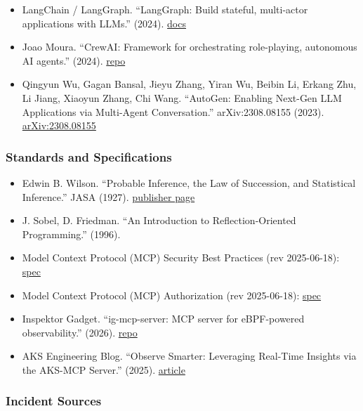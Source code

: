 \documentclass[
]{article}
\providecommand{\tightlist}{%
  \setlength{\itemsep}{0pt}\setlength{\parskip}{0pt}}
\begin{document}
\begin{itemize}
\tightlist
\item
  LangChain / LangGraph. ``LangGraph: Build stateful, multi-actor
  applications with LLMs.'' (2024).
  \href{https://langchain-ai.github.io/langgraph/}{docs}
\item
  Joao Moura. ``CrewAI: Framework for orchestrating role-playing,
  autonomous AI agents.'' (2024).
  \href{https://github.com/crewAIInc/crewAI}{repo}
\item
  Qingyun Wu, Gagan Bansal, Jieyu Zhang, Yiran Wu, Beibin Li, Erkang
  Zhu, Li Jiang, Xiaoyun Zhang, Chi Wang. ``AutoGen: Enabling Next-Gen
  LLM Applications via Multi-Agent Conversation.'' arXiv:2308.08155
  (2023). \href{https://arxiv.org/abs/2308.08155}{arXiv:2308.08155}
\end{itemize}

\subsubsection{Standards and
Specifications}\label{standards-and-specifications}

\begin{itemize}
\tightlist
\item
  Edwin B. Wilson. ``Probable Inference, the Law of Succession, and
  Statistical Inference.'' JASA (1927).
  \href{https://www.tandfonline.com/doi/abs/10.1080/01621459.1927.10502953}{publisher
  page}
\item
  J. Sobel, D. Friedman. ``An Introduction to Reflection-Oriented
  Programming.'' (1996).
\item
  Model Context Protocol (MCP) Security Best Practices (rev 2025-06-18):
  \href{https://modelcontextprotocol.io/specification/2025-06-18/basic/security_best_practices}{spec}
\item
  Model Context Protocol (MCP) Authorization (rev 2025-06-18):
  \href{https://modelcontextprotocol.io/specification/2025-06-18/basic/authorization}{spec}
\item
  Inspektor Gadget. ``ig-mcp-server: MCP server for eBPF-powered
  observability.'' (2026).
  \href{https://github.com/inspektor-gadget/ig-mcp-server}{repo}
\item
  AKS Engineering Blog. ``Observe Smarter: Leveraging Real-Time Insights
  via the AKS-MCP Server.'' (2025).
  \href{https://blog.aks.azure.com/2025/08/20/real-time-observability-in-aks-mcp-server}{article}
\end{itemize}

\subsubsection{Incident Sources}\label{incident-sources}
\end{document}
